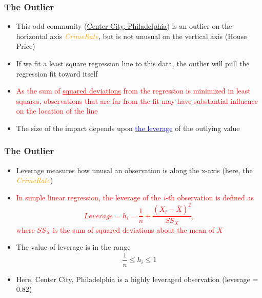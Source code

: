 \documentclass[compress]{beamer}
\begin{document}
\begin{frame}
\frametitle{\sc The Outlier}
	\begin{itemize}
		\item This odd community (\underline{Center City, Philadelphia})  is an outlier on the horizontal axis \textcolor{orange}{\textit{CrimeRate}}, but is not unusual on the vertical axis (House Price)
		\item If we fit a least square regression line to this data, the outlier will pull the regression fit toward itself
		\item \textcolor{red}{As the sum of \underline{squared deviations} from the regression is minimized in least squares, observations that are far from the fit may have substantial influence on the location of the line}
		\item The size of the impact depends upon \underline{\textcolor{blue}{the leverage}} of the outlying value
    \end{itemize}		
\end{frame}

\begin{frame}
\frametitle{\sc The Outlier}
	\begin{itemize}
		\item Leverage measures how unusal an observation is along the x-axis (here, the \textcolor{orange}{\textit{CrimeRate}})
		\item \textcolor{red}{In simple linear regression, the leverage of the $i$-th observation is defined as
		\[
		Leverage = h_i = \frac{1}{n} + \frac{(X_i - \bar{X})^2}{SS_X},
		\]
		where $SS_X$ is the sum of squared deviations about the mean of $X$}
		\item The value of leverage is in the range 
		\[
		\frac{1}{n} \leq h_i \leq 1
		\]
		\item Here, Center City, Philadelphia is a highly leveraged observation (leverage = 0.82)
    \end{itemize}		
\end{frame}
\end{document}
